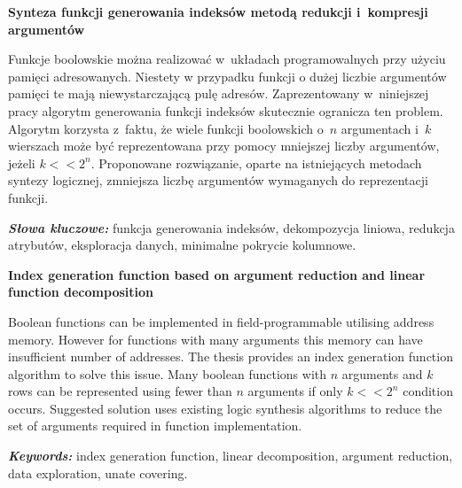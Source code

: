 \newpage
\vspace{10cm}

\newpage
\begin{center}
	\textbf{Synteza funkcji generowania indeksów metodą redukcji i~kompresji argumentów}
\end{center}

Funkcje boolowskie można realizować w~układach programowalnych przy użyciu pamięci adresowanych.
Niestety w przypadku funkcji o dużej liczbie argumentów pamięci te mają niewystarczającą pulę adresów.
Zaprezentowany w~niniejszej pracy algorytm generowania funkcji indeksów skutecznie ogranicza ten problem.
Algorytm korzysta z~faktu,
że wiele funkcji boolowskich o~$n$ argumentach i~$k$ wierszach może być reprezentowana przy pomocy mniejszej liczby argumentów,
jeżeli $k<<2^n$.
Proponowane rozwiązanie,
oparte na istniejących metodach syntezy logicznej,
zmniejsza liczbę argumentów wymaganych do reprezentacji funkcji.

\textit{\textbf{Słowa kluczowe:}} funkcja generowania indeksów, dekompozycja liniowa, redukcja atrybutów, eksploracja danych, minimalne pokrycie kolumnowe.

	\vspace{1cm}
\newpage

\begin{center}
    \textbf{Index generation function based on argument reduction and linear function decomposition}
\end{center}

Boolean functions can be implemented in field-programmable utilising address memory.
However for functions with many arguments this memory can have insufficient number of addresses.
The thesis provides an index generation function algorithm to solve this issue.
Many boolean functions with $n$ arguments and $k$ rows can be represented using fewer than $n$ arguments if only $k<<2^n$ condition occurs.
Suggested solution uses existing logic synthesis algorithms to reduce the set of arguments required in function implementation.

\textit{\textbf{Keywords:}} index generation function, linear decomposition, argument reduction, data exploration, unate covering.

